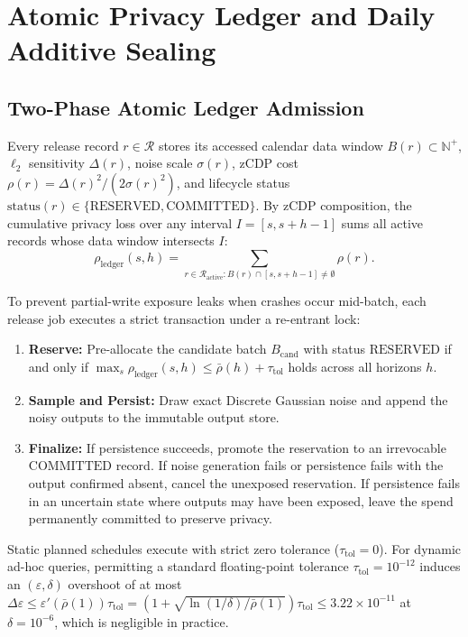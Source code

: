 \documentclass[sigconf, nonacm]{acmart}
\begin{document}
\section{Atomic Privacy Ledger and Daily Additive Sealing}
\label{sec:sealing}

\subsection{Two-Phase Atomic Ledger Admission}
Every release record $r \in \mathcal{R}$ stores its accessed calendar data window $B(r) \subset \mathbb{N}^+$, $\ell_2$ sensitivity $\Delta(r)$, noise scale $\sigma(r)$, zCDP cost $\rho(r) = \Delta(r)^2 / (2\sigma(r)^2)$, and lifecycle status $\mathrm{status}(r) \in \{\mathrm{RESERVED}, \mathrm{COMMITTED}\}$. By zCDP composition, the cumulative privacy loss over any interval $I = [s, s+h-1]$ sums all active records whose data window intersects $I$:
\begin{equation}
\label{eq:ledger_rho}
\rho_{\mathrm{ledger}}(s, h) = \sum_{r \in \mathcal{R}_{\mathrm{active}} : B(r) \cap [s, s+h-1] \ne \emptyset} \rho(r).
\end{equation}

To prevent partial-write exposure leaks when crashes occur mid-batch, each release job executes a strict transaction under a re-entrant lock:
\begin{enumerate}[leftmargin=*, nosep, topsep=2pt]
    \item \textbf{Reserve:} Pre-allocate the candidate batch $B_{\mathrm{cand}}$ with status $\mathrm{RESERVED}$ if and only if $\max_s \rho_{\mathrm{ledger}}(s, h) \le \bar{\rho}(h) + \tau_{\mathrm{tol}}$ holds across all horizons $h$.
    \item \textbf{Sample and Persist:} Draw exact Discrete Gaussian noise and append the noisy outputs to the immutable output store.
    \item \textbf{Finalize:} If persistence succeeds, promote the reservation to an irrevocable $\mathrm{COMMITTED}$ record. If noise generation fails or persistence fails with the output confirmed absent, cancel the unexposed reservation. If persistence fails in an uncertain state where outputs may have been exposed, leave the spend permanently committed to preserve privacy.
\end{enumerate}
Static planned schedules execute with strict zero tolerance ($\tau_{\mathrm{tol}} = 0$). For dynamic ad-hoc queries, permitting a standard floating-point tolerance $\tau_{\mathrm{tol}} = 10^{-12}$ induces an $(\varepsilon, \delta)$ overshoot of at most $\Delta\varepsilon \le \varepsilon'(\bar{\rho}(1))\tau_{\mathrm{tol}} = \left(1 + \sqrt{\ln(1/\delta)/\bar{\rho}(1)}\right)\tau_{\mathrm{tol}} \le 3.22 \times 10^{-11}$ at $\delta = 10^{-6}$, which is negligible in practice.
\end{document}
